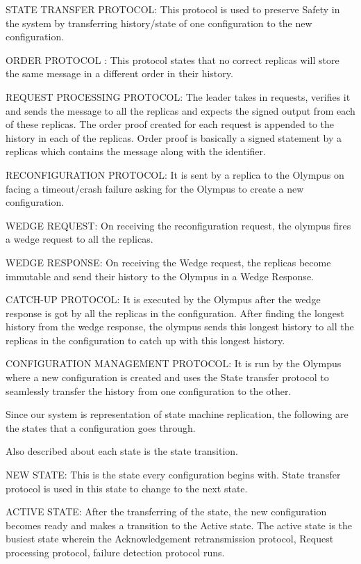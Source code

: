\documentclass[letterpaper, 10 pt, conference]{ieeeconf}  %
\begin{document}
STATE TRANSFER PROTOCOL: This protocol is used to preserve Safety in the system by transferring history/state of one configuration to the new configuration. \smallskip

ORDER PROTOCOL : This protocol states that no correct replicas will store the same message in a different order in their history.\smallskip

REQUEST PROCESSING PROTOCOL: The leader takes in requests, verifies it and sends the message to all the replicas and expects the signed output from each of these replicas. The order proof created for each request is appended to the history in each of the replicas. Order proof is basically a signed statement by a replicas which contains the message along with the identifier.\smallskip

RECONFIGURATION PROTOCOL: It is sent by a replica to the Olympus on facing a timeout/crash failure asking for the Olympus to create a new configuration.\smallskip

WEDGE REQUEST: On receiving the reconfiguration request, the olympus fires a wedge request to all the replicas.\smallskip

WEDGE RESPONSE: On receiving the Wedge request, the replicas become immutable and send their history to the Olympus in a Wedge Response.\smallskip

CATCH-UP PROTOCOL: It is executed by the Olympus after the wedge response is got by all the replicas in the configuration. After finding the longest history from the wedge response, the olympus sends this longest history to all the replicas in the configuration to catch up with this longest history. \smallskip

CONFIGURATION MANAGEMENT PROTOCOL: It is run by the Olympus where a new configuration is created and uses the State transfer protocol to seamlessly transfer the history from one configuration to the other.\smallskip

Since our system is representation of state machine replication, the following are the states that a configuration goes through.

Also described about each state is the state transition. \smallskip

NEW STATE: This is the state every configuration begins with. State transfer protocol is used in this state to change to the next state.\smallskip

ACTIVE STATE: After the transferring of the state, the new configuration becomes ready and makes a transition to the Active state. The active state is the busiest state wherein the Acknowledgement retransmission protocol, Request processing protocol, failure detection protocol runs.\smallskip
\end{document}
